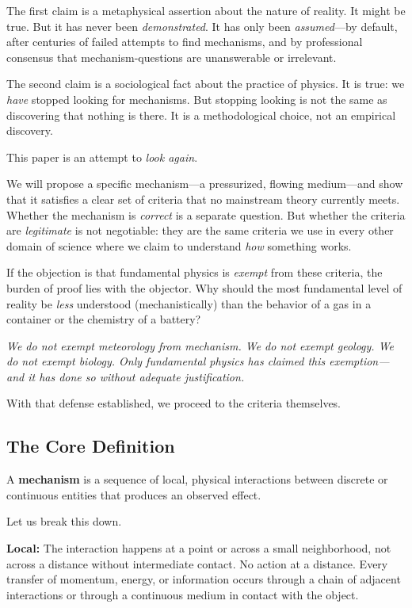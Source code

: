 \documentclass[12pt, a4paper]{article}
\begin{document}
The first claim is a metaphysical assertion about the nature of reality. It might be true. But it has never been \textit{demonstrated}. It has only been \textit{assumed}—by default, after centuries of failed attempts to find mechanisms, and by professional consensus that mechanism-questions are unanswerable or irrelevant.

The second claim is a sociological fact about the practice of physics. It is true: we \textit{have} stopped looking for mechanisms. But stopping looking is not the same as discovering that nothing is there. It is a methodological choice, not an empirical discovery.

This paper is an attempt to \textit{look again}.

We will propose a specific mechanism—a pressurized, flowing medium—and show that it satisfies a clear set of criteria that no mainstream theory currently meets. Whether the mechanism is \textit{correct} is a separate question. But whether the criteria are \textit{legitimate} is not negotiable: they are the same criteria we use in every other domain of science where we claim to understand \textit{how} something works.

If the objection is that fundamental physics is \textit{exempt} from these criteria, the burden of proof lies with the objector. Why should the most fundamental level of reality be \textit{less} understood (mechanistically) than the behavior of a gas in a container or the chemistry of a battery?

\textit{We do not exempt meteorology from mechanism. We do not exempt geology. We do not exempt biology. Only fundamental physics has claimed this exemption—and it has done so without adequate justification.}

With that defense established, we proceed to the criteria themselves.

\subsection{The Core Definition}
\label{subsec:core_definition}

A \textbf{mechanism} is a sequence of local, physical interactions between discrete or continuous entities that produces an observed effect.

Let us break this down.

\textbf{Local:} The interaction happens at a point or across a small neighborhood, not across a distance without intermediate contact. No action at a distance. Every transfer of momentum, energy, or information occurs through a chain of adjacent interactions or through a continuous medium in contact with the object.
\end{document}
